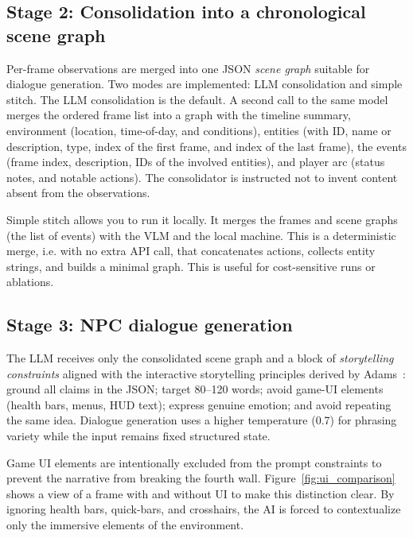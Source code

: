 \documentclass{article}
\begin{document}
\subsection{Stage 2: Consolidation into a chronological scene graph}

Per-frame observations are merged into one JSON \emph{scene graph} suitable for dialogue generation. Two modes are implemented: LLM consolidation and simple stitch.
The LLM consolidation is the default.
A second call to the same model merges the ordered frame list into a graph with the timeline summary, environment (location, time-of-day, and conditions), entities (with ID, name or description, type, index of the first frame, and index of the last frame), the events (frame index, description, IDs of the involved entities), and player arc (status notes, and notable actions). The consolidator is instructed not to invent content absent from the observations.

Simple stitch allows you to run it locally. It merges the frames and scene graphs (the list of events) with the VLM and the local machine.
This is a deterministic merge, i.e. with no extra API call, that concatenates actions, collects entity strings, and builds a minimal graph. This is useful for cost-sensitive runs or ablations.

\subsection{Stage 3: NPC dialogue generation}

The LLM receives only the consolidated scene graph and a block of \emph{storytelling constraints} aligned with the interactive storytelling principles derived by Adams~\cite{Adams2014}: ground all claims in the JSON; target 80--120 words; avoid game-UI elements (health bars, menus, HUD text); express genuine emotion; and avoid repeating the same idea. Dialogue generation uses a higher temperature (0.7) for phrasing variety while the input remains fixed structured state.

Game UI elements are intentionally excluded from the prompt constraints to prevent the narrative from breaking the fourth wall. Figure~\ref{fig:ui_comparison} shows a view of a frame with and without UI to make this distinction clear. By ignoring health bars, quick-bars, and crosshairs, the AI is forced to contextualize only the immersive elements of the environment.
\end{document}
